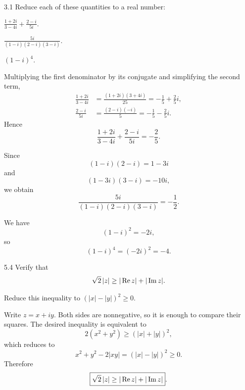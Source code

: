 \documentclass[11pt,oneside]{article}
\begin{document}

\begin{exercise}{3.1}
Reduce each of these quantities to a real number:
\begin{exercisesubparts}
    \item \(\displaystyle \frac{1+2i}{3-4i}+\frac{2-i}{5i}\).
    \item \(\displaystyle \frac{5i}{(1-i)(2-i)(3-i)}\).
    \item \((1-i)^4\).
\end{exercisesubparts}
\end{exercise}

\begin{solution}
\begin{exercisesubparts}
    \item Multiplying the first denominator by its conjugate and simplifying the second term,
    \[
    \begin{aligned}
        \frac{1+2i}{3-4i}
        &=\frac{(1+2i)(3+4i)}{25}
        =-\frac15+\frac25i, \\
        \frac{2-i}{5i}
        &=\frac{(2-i)(-i)}5
        =-\frac15-\frac25i.
    \end{aligned}
    \]
    Hence
    \[
        \boxed{\frac{1+2i}{3-4i}+\frac{2-i}{5i}=-\frac25}.
    \]

    \item Since
    \[
        (1-i)(2-i)=1-3i
    \]
    and
    \[
        (1-3i)(3-i)=-10i,
    \]
    we obtain
    \[
        \boxed{\frac{5i}{(1-i)(2-i)(3-i)}=-\frac12}.
    \]

    \item We have
    \[
        (1-i)^2=-2i,
    \]
    so
    \[
        \boxed{(1-i)^4=(-2i)^2=-4}.
    \]
\end{exercisesubparts}
\end{solution}

\begin{exercise}{5.4}
Verify that
\[
    \sqrt{2}\,|z|\ge |\operatorname{Re} z|+|\operatorname{Im} z|.
\]
\begin{suggestion}
Reduce this inequality to \((|x|-|y|)^2\ge0\).
\end{suggestion}
\end{exercise}

\begin{solution}
Write \(z=x+iy\). Both sides are nonnegative, so it is enough to compare their squares. The desired inequality is equivalent to
\[
    2(x^2+y^2)\ge (|x|+|y|)^2,
\]
which reduces to
\[
    x^2+y^2-2|xy|=(|x|-|y|)^2\ge0.
\]
Therefore
\[
    \boxed{\sqrt{2}\,|z|\ge |\operatorname{Re} z|+|\operatorname{Im} z|}.
\]
\end{solution}
\end{document}
